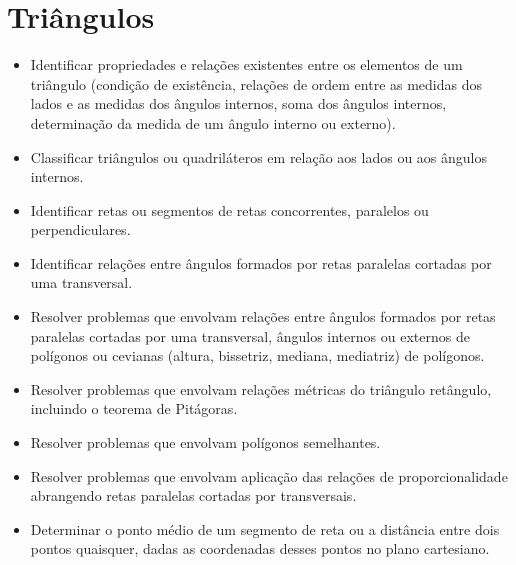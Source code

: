 {%

\chapter{Triângulos}

\begin{itemize}
\item Identificar propriedades e relações existentes
entre os elementos de um triângulo (condição de existência, relações de
ordem entre as medidas dos lados e as medidas dos ângulos internos, soma
dos ângulos internos, determinação da medida de um ângulo interno ou
externo).
\item
  Classificar triângulos ou quadriláteros em relação aos lados ou aos
  ângulos internos.
\item
  Identificar retas ou segmentos de retas concorrentes, paralelos ou
  perpendiculares.
\item
  Identificar relações entre ângulos formados por retas paralelas
  cortadas por uma transversal.
\item
  Resolver problemas que envolvam relações entre ângulos formados por
  retas paralelas cortadas por uma transversal, ângulos internos ou
  externos de polígonos ou cevianas (altura, bissetriz, mediana,
  mediatriz) de polígonos.
\item
  Resolver problemas que envolvam relações métricas do triângulo
  retângulo, incluindo o teorema de Pitágoras.
\item
  Resolver problemas que envolvam polígonos semelhantes.
\item
  Resolver problemas que envolvam aplicação das relações de
  proporcionalidade abrangendo retas paralelas cortadas por
  transversais.
\item
  Determinar o ponto médio de um segmento de reta ou a distância entre
  dois pontos quaisquer, dadas as coordenadas desses pontos no plano
  cartesiano.
\end{itemize}


}

